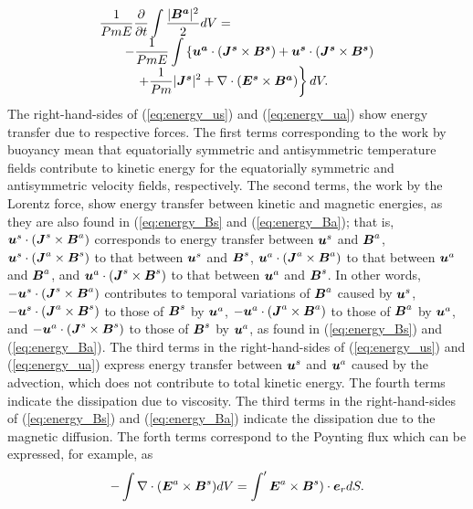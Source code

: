 %
\begin{equation}
\begin{array}{l}
\displaystyle
\frac{1}{Pm E}\frac{\partial}{\partial t}
 \int \frac{|\mbox{\boldmath$B^a$}|^2}{2} d V =
\nonumber \\
\hspace*{2em}
\displaystyle
- \frac{1}{Pm E}\int \left\{
      \mbox{\boldmath$u^a$} \cdot 
          ( \mbox{\boldmath$J^s$} \times \mbox{\boldmath$B^s$} )
    + \mbox{\boldmath$u^s$} \cdot 
          ( \mbox{\boldmath$J^s$} \times \mbox{\boldmath$B^s$} )
    \right.
\nonumber \\
\hspace{3em}
\displaystyle
    \left.
    + \frac{1}{Pm} |\mbox{\boldmath$J^s$}|^2
    + \nabla \cdot ( \mbox{\boldmath$E^s$} \times \mbox{\boldmath$B^a$} ) 
      \right\} d V.
\end{array}
\label{eq:energy_Ba}
\end{equation}
%
The right-hand-sides of (\ref{eq:energy_us}) and (\ref{eq:energy_ua}) show energy transfer due to respective forces.
The first terms corresponding to the work by buoyancy mean that equatorially symmetric and antisymmetric temperature fields contribute to kinetic energy for the equatorially symmetric and antisymmetric velocity fields, respectively.
The second terms, the work by the Lorentz force, show energy transfer between kinetic and magnetic energies, as they are also found in (\ref{eq:energy_Bs} and (\ref{eq:energy_Ba}); that is, $\mbox{\boldmath$u$}^s \cdot (\mbox{\boldmath$J$}^s \times \mbox{\boldmath$B$}^a)$ corresponds to energy transfer between $\mbox{\boldmath$u$}^s$ and $\mbox{\boldmath$B$}^a$, $\mbox{\boldmath$u$}^s \cdot (\mbox{\boldmath$J$}^a \times \mbox{\boldmath$B$}^s)$ to that between $\mbox{\boldmath$u$}^s$ and $\mbox{\boldmath$B$}^s$, $\mbox{\boldmath$u$}^a \cdot (\mbox{\boldmath$J$}^a \times \mbox{\boldmath$B$}^a)$ to that between $\mbox{\boldmath$u$}^a$ and $\mbox{\boldmath$B$}^a$, and $\mbox{\boldmath$u$}^a \cdot (\mbox{\boldmath$J$}^s \times \mbox{\boldmath$B$}^s)$ to that between $\mbox{\boldmath$u$}^a$ and $\mbox{\boldmath$B$}^s$.
In other words, $-\mbox{\boldmath$u$}^s \cdot (\mbox{\boldmath$J$}^s \times \mbox{\boldmath$B$}^a)$ contributes to temporal variations of $\mbox{\boldmath$B$}^a$ caused by $\mbox{\boldmath$u$}^s$, $-\mbox{\boldmath$u$}^s \cdot (\mbox{\boldmath$J$}^a \times \mbox{\boldmath$B$}^s)$ to those of $\mbox{\boldmath$B$}^s$ by $\mbox{\boldmath$u$}^a$, $-\mbox{\boldmath$u$}^a \cdot (\mbox{\boldmath$J$}^a \times \mbox{\boldmath$B$}^a)$ to those of $\mbox{\boldmath$B$}^a$ by $\mbox{\boldmath$u$}^a$, and $-\mbox{\boldmath$u$}^a \cdot (\mbox{\boldmath$J$}^s \times \mbox{\boldmath$B$}^s)$ to those of $\mbox{\boldmath$B$}^s$ by $\mbox{\boldmath$u$}^a$, as found in (\ref{eq:energy_Bs}) and (\ref{eq:energy_Ba}).
The third terms in the right-hand-sides of (\ref{eq:energy_us}) and (\ref{eq:energy_ua}) express energy transfer between $\mbox{\boldmath$u$}^s$ and $\mbox{\boldmath$u$}^a$ caused by the advection, which does not contribute to total kinetic energy.
The fourth terms indicate the dissipation due to viscosity.
The third terms in the right-hand-sides of (\ref{eq:energy_Bs}) and (\ref{eq:energy_Ba}) indicate the dissipation due to the magnetic diffusion.
The forth terms correspond to the Poynting flux which can be expressed, for example, as
%
\begin{equation}
-\int \nabla \cdot
  ( \mbox{\boldmath$E$}^a \times \mbox{\boldmath$B$}^s ) d V =
 \int ' \mbox{\boldmath$E$}^a \times \mbox{\boldmath$B$}^s )
   \cdot \mbox{\boldmath$e$}_r d S .
\label{eq:Poynting}
\end{equation}
%

